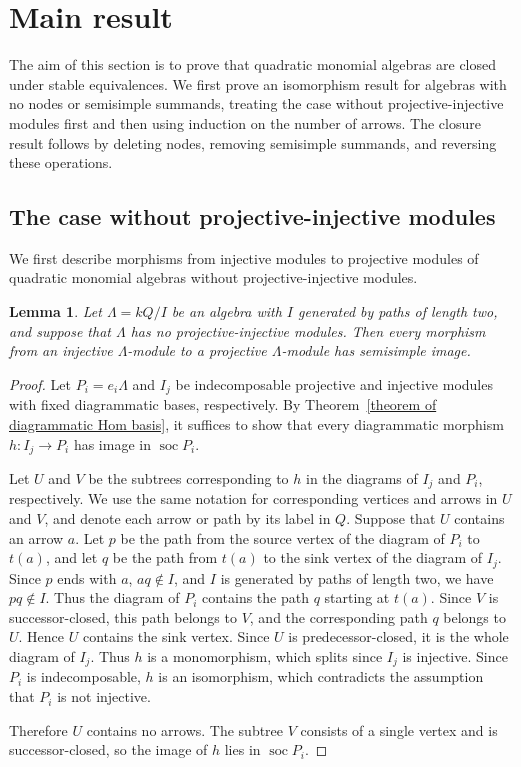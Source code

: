 \documentclass[11pt]{article}
\newcommand{\soc}{\operatorname{soc}}
\providecommand{\varLambda}{\Lambda}
\newtheorem{lemma}[theorem]{Lemma}
\theoremstyle{definition}
\begin{document}
\section{Main result}\label{section of Martinez-Villa question}
	The aim of this section is to prove that quadratic monomial algebras are closed under stable equivalences.
	We first prove an isomorphism result for algebras with no nodes or semisimple summands, treating the case without projective-injective modules first and then using induction on the number of arrows.
	The closure result follows by deleting nodes, removing semisimple summands, and reversing these operations.

	\subsection{The case without projective-injective modules}\label{section of algebra reconstruction}
		We first describe morphisms from injective modules to projective modules of quadratic monomial algebras without projective-injective modules.

		\begin{lemma}\label{lemma of injective to projective}
			Let $\varLambda=kQ/I$ be an algebra with $I$ generated by paths of length two, and suppose that $\varLambda$ has no projective-injective modules.
			Then every morphism from an injective $\varLambda$-module to a projective $\varLambda$-module has semisimple image.
		\end{lemma}
		\begin{proof}
			Let $P_i=e_i\varLambda$ and $I_j$ be indecomposable projective and injective modules with fixed diagrammatic bases, respectively.
			By Theorem~\ref{theorem of diagrammatic Hom basis}, it suffices to show that every diagrammatic morphism $h:I_j\to P_i$ has image in $\soc P_i$.

			Let $U$ and $V$ be the subtrees corresponding to $h$ in the diagrams of $I_j$ and $P_i$, respectively.
			We use the same notation for corresponding vertices and arrows in $U$ and $V$, and denote each arrow or path by its label in $Q$.
			Suppose that $U$ contains an arrow $a$.
			Let $p$ be the path from the source vertex of the diagram of $P_i$ to $t(a)$, and let $q$ be the path from $t(a)$ to the sink vertex of the diagram of $I_j$.
			Since $p$ ends with $a$, $aq\notin I$, and $I$ is generated by paths of length two, we have $pq\notin I$.
			Thus the diagram of $P_i$ contains the path $q$ starting at $t(a)$.
			Since $V$ is successor-closed, this path belongs to $V$, and the corresponding path $q$ belongs to $U$.
			Hence $U$ contains the sink vertex.
			Since $U$ is predecessor-closed, it is the whole diagram of $I_j$.
			Thus $h$ is a monomorphism, which splits since $I_j$ is injective.
			Since $P_i$ is indecomposable, $h$ is an isomorphism, which contradicts the assumption that $P_i$ is not injective.

			Therefore $U$ contains no arrows.
			The subtree $V$ consists of a single vertex and is successor-closed, so the image of $h$ lies in $\soc P_i$.
		\end{proof}
\end{document}
